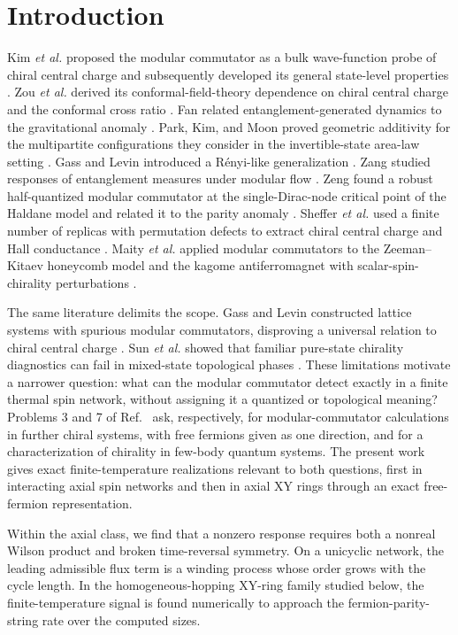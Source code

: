 \documentclass[11pt]{article}
\begin{document}
\section{Introduction}
\label{sec:introduction}

Kim \textit{et al.} proposed the modular commutator as a bulk wave-function
probe of chiral central charge \cite{KimEtAl2022PRL} and subsequently
developed its general state-level properties \cite{KimEtAl2022PRB}.  Zou
\textit{et al.} derived its conformal-field-theory dependence on chiral
central charge and the conformal cross ratio \cite{ZouEtAl2022}.  Fan related
entanglement-generated dynamics to the gravitational anomaly
\cite{Fan2022}.  Park, Kim, and Moon proved geometric additivity for the
multipartite configurations they consider in the invertible-state area-law
setting \cite{ParkEtAl2025}.  Gass and Levin introduced
a R\'enyi-like generalization \cite{GassLevin2026}.  Zang studied responses of
entanglement measures under modular flow \cite{Zang2026}.  Zeng found a
robust half-quantized modular commutator at the single-Dirac-node critical
point of the Haldane model and related it to the parity anomaly
\cite{Zeng2026}.  Sheffer
\textit{et al.} used a finite number of replicas with permutation defects to
extract chiral central charge and Hall conductance \cite{ShefferEtAl2026}.
Maity \textit{et al.} applied modular commutators to the Zeeman--Kitaev
honeycomb model and the kagome antiferromagnet with scalar-spin-chirality
perturbations \cite{MaityEtAl2025}.

The same literature delimits the scope.  Gass and Levin constructed lattice
systems with spurious modular commutators, disproving a universal relation to
chiral central charge \cite{GassLevin2024}.  Sun \textit{et al.} showed that
familiar pure-state chirality diagnostics can fail in mixed-state topological
phases \cite{SunEtAl2026}.  These limitations motivate a
narrower question: what can the modular commutator detect exactly in a finite
thermal spin network, without assigning it a quantized or topological
meaning?  Problems 3 and 7 of Ref.~\cite{KimEtAl2022PRB} ask, respectively,
for modular-commutator calculations in further chiral systems, with free
fermions given as one direction, and for a characterization of chirality in
few-body quantum systems.  The present work gives exact finite-temperature
realizations relevant to both questions, first in interacting axial spin
networks and then in axial XY rings through an exact free-fermion
representation.

Within the axial class, we find that a nonzero response requires both a
nonreal Wilson product and broken time-reversal symmetry.  On a unicyclic
network, the leading admissible flux term is a winding process whose order
grows with the cycle length.  In the homogeneous-hopping XY-ring family
studied below, the finite-temperature signal is found numerically to approach
the fermion-parity-string rate over the computed sizes.
\end{document}
